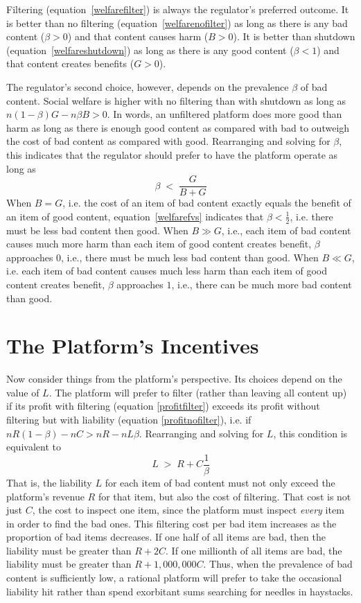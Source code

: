 \documentclass[openbib,12pt]{article}  %
\begin{document}
Filtering (equation~\ref{welfarefilter}) is always the regulator's preferred outcome. It is better than no filtering (equation~\ref{welfarenofilter}) as long as there is any bad content ($\beta > 0$) and that content causes harm ($B > 0$). It is better than shutdown (equation~\ref{welfareshutdown}) as long as there is any good content ($\beta < 1$) and that content creates benefits ($G > 0$).

The regulator's second choice, however, depends on the prevalence $\beta$ of bad content. Social welfare is higher with no filtering than with shutdown as long as $n(1-\beta)G - n \beta B > 0$. In words, an unfiltered platform does more good than harm as long as there is enough good content as compared with bad to outweigh the cost of bad content as compared with good. Rearranging and solving for $\beta$, this indicates that the regulator should prefer to have the platform operate as long as
\begin{equation}
\label{welfarefvs}
\beta \;<\; \frac{G}{B+G}
\end{equation}
When $B=G$, i.e. the cost of an item of bad content exactly equals the benefit of an item of good content, equation~\ref{welfarefvs} indicates that $\beta < \frac{1}{2}$, i.e. there must be less bad content then good. When $B \gg G$, i.e., each item of bad content causes much more harm than each item of good content creates benefit, $\beta$ approaches $0$, i.e., there must be much less bad content than good. When $B \ll G$, i.e. each item of bad content causes much less harm than each item of good content creates benefit, $\beta$ approaches $1$, i.e., there can be much more bad content than good.

\section{The Platform's Incentives}

Now consider things from the platform's perspective.  Its choices depend on the value of $L$. The platform will prefer to filter (rather than leaving all content up) if its profit with filtering (equation \ref{profitfilter}) exceeds its profit without filtering but with liability (equation \ref{profitnofilter}), i.e. if $nR(1 - \beta) - nC >  nR - nL\beta$. Rearranging and solving for $L$,  this condition is equivalent to 
\begin{equation}
\label{dofilter}
L \;>\; R + C\frac{1}{\beta}
\end{equation}
That is, the liability $L$ for each item of bad content must not only exceed the platform's revenue $R$ for that item, but also the cost of filtering. That cost is not just $C$, the cost to inspect one item, since the platform must inspect \emph{every} item in order to find the bad ones. This filtering cost per bad item increases as the proportion of bad items decreases. If one half of all items are bad, then the  liability must be greater than $R + 2C$. If one millionth of all items are bad, the liability must be greater than $R + 1,000,000C$. Thus, when the prevalence of bad content is sufficiently low, a rational platform  will prefer to take the occasional liability hit rather than spend exorbitant sums searching for needles in haystacks.  
\end{document}
